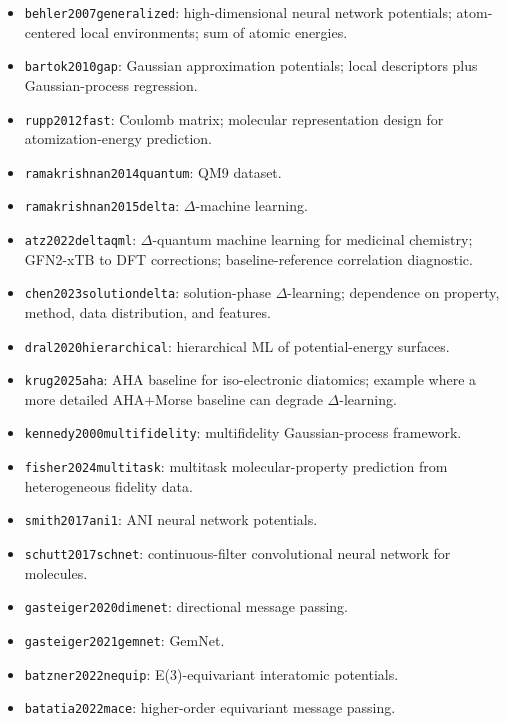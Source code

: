 \documentclass[11pt]{article}
\begin{document}
\begin{itemize}
  \item \texttt{behler2007generalized}: high-dimensional neural network potentials; atom-centered local environments; sum of atomic energies.
  \item \texttt{bartok2010gap}: Gaussian approximation potentials; local descriptors plus Gaussian-process regression.
  \item \texttt{rupp2012fast}: Coulomb matrix; molecular representation design for atomization-energy prediction.
  \item \texttt{ramakrishnan2014quantum}: QM9 dataset.
  \item \texttt{ramakrishnan2015delta}: \(\Delta\)-machine learning.
  \item \texttt{atz2022deltaqml}: \(\Delta\)-quantum machine learning for medicinal chemistry; GFN2-xTB to DFT corrections; baseline-reference correlation diagnostic.
  \item \texttt{chen2023solutiondelta}: solution-phase \(\Delta\)-learning; dependence on property, method, data distribution, and features.
  \item \texttt{dral2020hierarchical}: hierarchical ML of potential-energy surfaces.
  \item \texttt{krug2025aha}: AHA baseline for iso-electronic diatomics; example where a more detailed AHA+Morse baseline can degrade \(\Delta\)-learning.
  \item \texttt{kennedy2000multifidelity}: multifidelity Gaussian-process framework.
  \item \texttt{fisher2024multitask}: multitask molecular-property prediction from heterogeneous fidelity data.
  \item \texttt{smith2017ani1}: ANI neural network potentials.
  \item \texttt{schutt2017schnet}: continuous-filter convolutional neural network for molecules.
  \item \texttt{gasteiger2020dimenet}: directional message passing.
  \item \texttt{gasteiger2021gemnet}: GemNet.
  \item \texttt{batzner2022nequip}: E(3)-equivariant interatomic potentials.
  \item \texttt{batatia2022mace}: higher-order equivariant message passing.
\end{itemize}



\end{document}
